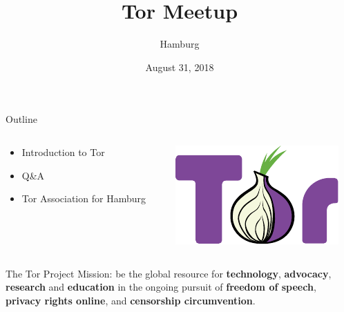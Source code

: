 \documentclass[aspectratio=169,10pt]{beamer}
\title{Tor Meetup}
\subtitle{Hamburg}
\date{August 31, 2018}
\author{}
\institute{CCCHH}
\begin{document}
  
  \maketitle
  
  \begin{frame}[fragile]{Outline}
    \begin{columns}
      \begin{column}{0.5\textwidth}
        \begin{itemize}
          \item Introduction to Tor
          \item Q\&A
          \item Tor Association for Hamburg
        \end{itemize}
      \end{column}
      \begin{column}{0.5\textwidth}
        \begin{center}
          \begin{overlayarea}{\textwidth}{0.5\textheight}
            \includegraphics[width=\textwidth]{img/Color.pdf}
          \end{overlayarea}
        \end{center}
      \end{column}
    \end{columns}
  \end{frame}
  
  
  \begin{frame}[fragile]{The Tor Project}
    \alert{Mission:} be the global resource for \textbf{technology}, \textbf{advocacy}, \textbf{research} and \textbf{education} in the ongoing pursuit of \textbf{freedom of speech}, \textbf{privacy rights online}, and \textbf{censorship circumvention}.
  \end{frame}
  
\end{document}
